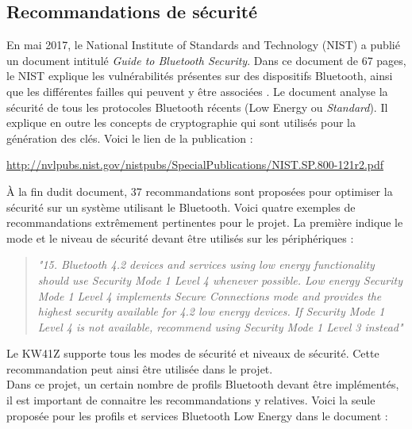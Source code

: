 \subsection{Recommandations de sécurité}
\label{sec-security_ble_recommendatiions}

En mai 2017, le National Institute of Standards and Technology (NIST) a publié un document intitulé \textit{Guide to Bluetooth Security}. Dans ce document de 67 pages, le NIST explique les vulnérabilités présentes sur des dispositifs Bluetooth, ainsi que les différentes failles qui peuvent y être associées \cite{GuidetoB8:online}. Le document analyse la sécurité de tous les protocoles Bluetooth récents (Low Energy ou \textit{Standard}). Il explique en outre les concepts de cryptographie qui sont utilisés pour la génération des clés. Voici le lien de la publication : 
\begin{center}
    \small{\url{http://nvlpubs.nist.gov/nistpubs/SpecialPublications/NIST.SP.800-121r2.pdf}}
\end{center}

À la fin dudit document, 37 recommandations sont proposées pour optimiser la sécurité sur un système utilisant le Bluetooth. Voici quatre exemples de recommandations extrêmement pertinentes pour le projet. La première indique le mode et le niveau de sécurité devant être utilisés sur les périphériques : 

\begin{quote}
\begin{center}
    \textit{"15. Bluetooth 4.2 devices and services using low energy functionality should use Security Mode 1 Level 4 whenever possible. Low energy Security Mode 1 Level 4 implements Secure Connections mode and provides the highest security available for 4.2 low energy devices. If Security Mode 1 Level 4 is not available, recommend using Security Mode 1 Level 3 instead"}
\end{center}
\end{quote}

Le KW41Z supporte tous les modes de sécurité et niveaux de sécurité. Cette recommandation peut ainsi être utilisée dans le projet.\\


Dans ce projet, un certain nombre de profils Bluetooth devant être implémentés, il est important de connaitre les recommandations y relatives. Voici la seule proposée pour les profils et services Bluetooth Low Energy dans le document : 

